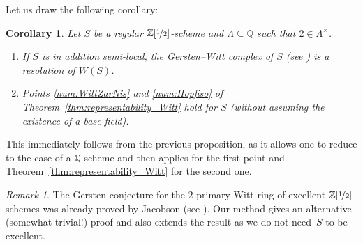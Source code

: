\documentclass[JEP,XML,SOM,Unicode]{cedram}
\newcommand{\ZZot} {\mathbb Z[\nicefrac 1 2]}
\newcommand{\QQ} {\mathbb Q}
\newtheorem{cor}[thm]{Corollary}
\theoremstyle{remark}
\newtheorem{rem}[thm]{Remark}
\theoremstyle{definition}
\numberwithin{equation}{thm}
\begin{document}
Let us draw the following corollary:
\begin{cor}\label{cor:Gersten--Witt_conj}
Let $S$ be a regular $\ZZot$-scheme and $\Lambda \subseteq \QQ$
such that $2 \in \Lambda^\times$.
\begin{enumerate}
\item If $S$ is in addition semi-local,
the Gersten--Witt complex of $S$ (see \cite{BalmerWalter}) is a resolution of $W(S)$.
\item Points \eqref{num:WittZarNis} and \eqref{num:Hopfiso} of Theorem~\ref{thm:representability_Witt}
hold for $S$ (\ie without assuming the existence of a base field).
\end{enumerate}
\end{cor}
This immediately follows from the previous proposition,
as it allows one to reduce to the case of a $\QQ$-scheme and then applies
\cite[4.3]{BalmerWitt} for the first point and Theorem~\ref{thm:representability_Witt}
for the second one.

\begin{rem}\label{rem:Jacobson}
The Gersten conjecture for the $2$-primary Witt ring of excellent $\ZZot$-schemes
was already proved by Jacobson (see \cite[5.3]{Jacobson}).
Our method gives an alternative (somewhat trivial!) proof
and also extends the result as we do not need~$S$ to be excellent.
\end{rem}

\backmatter


\end{document}
